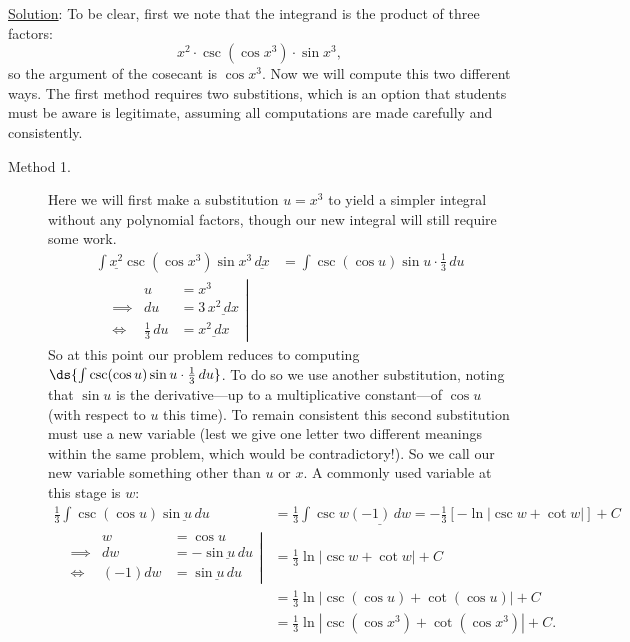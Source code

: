 \underline{Solution}:  To be clear, first
we note that the integrand is the product of three
factors:
$$x^2\cdot\csc\left(\cos x^3\right)\cdot\sin x^3,$$
so the argument of the cosecant is $\cos x^3$.
Now we will compute this two different ways.
The first method requires two substitions, which is an option that
students must be aware is legitimate, assuming all computations are
made carefully and consistently.
\begin{description}
\item[Method 1.] Here we will first make a substitution $u=x^3$
to yield a simpler integral without any polynomial factors, 
though our new integral will still require some
work.
\begin{align*}
\int \underline{x^2}\csc\left(\cos x^3\right)\sin x^3\,\underline{dx}
 &=\int\csc(\cos u)\sin u\cdot\frac13\,du\\
\left.\begin{alignedat}{2}
&          &u&=x^3\\
&\implies &du&=3\,\underline{x^2\,dx}\\
&\iff&\frac13\,du&=\underline{x^2\,dx}
\end{alignedat}\right|&
\end{align*}
So at this point our problem reduces to computing
$\ds{\int\csc(\cos u)\sin u\cdot\frac13\,du}$.  
To do so we use another substitution, noting that
$\sin u$ is the derivative---up to a multiplicative constant---of
$\cos u$ (with respect to $u$ this time).
To remain consistent this second substitution must use a new
variable (lest we give one letter two different meanings within the
same problem, which would be contradictory!).
So we  call our new variable something other than $u$ or $x$.
A commonly used variable at this stage is $w$:
\begin{align*}
\frac13\int\csc(\cos u)\underline{\sin u\,du}
&=\frac13\int\csc w\underline{(-1)\,dw}
=-\frac13\left[-\ln|\csc w+\cot w|\right]+C\\
\left.\begin{alignedat}{2}
           &&w&=\cos u\\
 &\implies&dw&=-\underline{\sin u\,du}\\
 &\iff&(-1)dw&=\underline{\sin u\,du}
\end{alignedat}\right|
&=\frac13\ln|\csc w+\cot w|+C\\
&=\frac13\ln\left|\csc\left(\cos u\right)
      +\cot \left(\cos u\right)\right|+C\\
&=\frac13\ln\left|\csc\left(\cos x^3\right)
      +\cot \left(\cos x^3\right)\right|+C.\end{align*}

\end{description}
